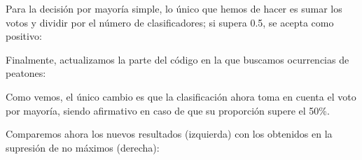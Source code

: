 \documentclass[11pt,a4paper]{article}
\begin{document}
                \par
                Para la decisión por mayoría simple, lo único que hemos de hacer es sumar los votos y dividir por el número de clasificadores; si supera 0.5, se acepta como positivo:


\newpage

                \par
                Finalmente, actualizamos la parte del código en la que buscamos ocurrencias de peatones:


                \par
                Como vemos, el único cambio es que la clasificación ahora toma en cuenta el voto por mayoría, siendo afirmativo en caso de que su proporción supere el 50\%.

                \par
                Comparemos ahora los nuevos resultados (izquierda) con los obtenidos en la supresión de no máximos (derecha):
\end{document}
